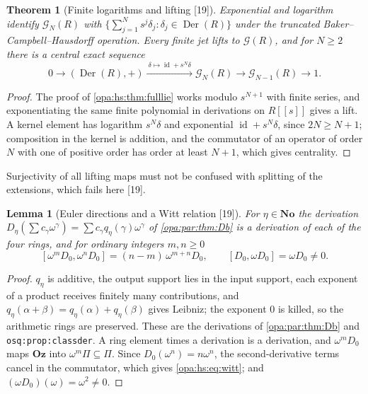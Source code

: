 \documentclass[11pt,oneside]{article}
\numberwithin{equation}{section}
\newtheorem{theorem}{Theorem}[section]
\newtheorem{lemma}[lemma]{Lemma}
\theoremstyle{definition}
\theoremstyle{remark}
\newcommand{\No}{\mathbf{No}}
\newcommand{\Oz}{\mathbf{Oz}}
\newcommand{\id}{\operatorname{id}}
\newcommand{\src}[1]{\textup{\textsf{\small[#1]}}}
\newcommand{\lbl}[1]{\nolinkurl{#1}}
\newcommand{\Der}{\operatorname{Der}}
\begin{document}
\begin{theorem}[Finite logarithms and lifting \src{19}]\label{opa:hs:thm:jetlift}
Exponential and logarithm identify $\mathcal G_N(R)$ with $\{\sum_{j=1}^Ns^j\delta_j:\delta_j\in\Der(R)\}$ under the truncated
Baker--Campbell--Hausdorff operation. Every finite jet lifts to $\mathcal G(R)$, and for $N\ge2$ there is a central exact sequence
\begin{equation}\label{opa:hs:eq:jetexact}
 0\longrightarrow(\Der(R),+)\xrightarrow{\ \delta\mapsto\id+s^N\delta\ }\mathcal G_N(R)\longrightarrow\mathcal G_{N-1}(R)\longrightarrow1 .
\end{equation}
\end{theorem}
\begin{proof}
The proof of \cref{opa:hs:thm:fulllie} works modulo $s^{N+1}$ with finite series, and exponentiating the same finite polynomial in derivations on
$R[[s]]$ gives a lift. A kernel element has logarithm $s^N\delta$ and exponential $\id+s^N\delta$, since $2N\ge N+1$; composition in the kernel is
addition, and the commutator of an operator of order $N$ with one of positive order has order at least $N+1$, which gives centrality.
\end{proof}

Surjectivity of all lifting maps must not be confused with splitting of the extensions, which fails here \src{19}.

\begin{lemma}[Euler directions and a Witt relation \src{19}]\label{opa:hs:lem:witt}
For $\eta\in\No$ the derivation $D_\eta(\sum c_\gamma\omega^\gamma)=\sum c_\gamma q_\eta(\gamma)\omega^\gamma$ of \cref{opa:par:thm:Db} is a derivation of each of
the four rings, and for ordinary integers $m,n\ge0$
\begin{equation}\label{opa:hs:eq:witt}
 [\omega^mD_0,\omega^nD_0]=(n-m)\,\omega^{m+n}D_0,\qquad [D_0,\omega D_0]=\omega D_0\ne0 .
\end{equation}
\end{lemma}
\begin{proof}
$q_\eta$ is additive, the output support lies in the input support, each exponent of a product receives finitely many contributions, and
$q_\eta(\alpha+\beta)=q_\eta(\alpha)+q_\eta(\beta)$ gives Leibniz; the exponent $0$ is killed, so the arithmetic rings are preserved. These are the
derivations of \cref{opa:par:thm:Db} and \lbl{osq:prop:classder}. A ring element times a derivation is a derivation, and $\omega^mD_0$ maps $\Oz$ into
$\omega^m\Pi\subseteq\Pi$. Since $D_0(\omega^n)=n\omega^n$, the second-derivative terms cancel in the commutator, which gives \eqref{opa:hs:eq:witt}; and
$(\omega D_0)(\omega)=\omega^2\ne0$.
\end{proof}
\end{document}
